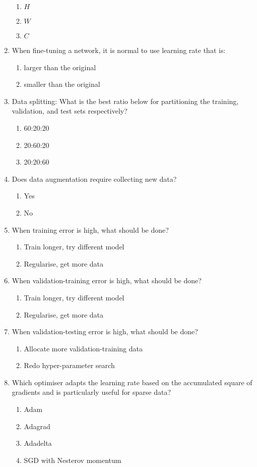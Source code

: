 \documentclass{report}
\numberwithin{equation}{section}
\begin{document}
\begin{enumerate}
\begin{enumerate}[label=\alph*.]
\item $H$
\item $W$
\item $C$
\end{enumerate}
\item When fine-tuning a network, it is normal to use learning rate that is:
\begin{enumerate}[label=\alph*.]
\item larger than the original
\item smaller than the original
\end{enumerate}
\item Data splitting: What is the best ratio below for partitioning the training, validation, and test sets respectively?
\begin{enumerate}[label=\alph*.]
\item 60:20:20
\item 20:60:20
\item 20:20:60
\end{enumerate}
\item Does data augmentation require collecting new data?
\begin{enumerate}[label=\alph*.]
\item Yes
\item No

\end{enumerate}
\item When training error is high, what should be done?
\begin{enumerate}[label=\alph*.]
\item Train longer, try different model
\item Regularise, get more data
\end{enumerate}
\item When validation-training error is high, what should be done?
\begin{enumerate}[label=\alph*.]
\item Train longer, try different model
\item Regularise, get more data
\end{enumerate}
\item When validation-testing error is high, what should be done?
\begin{enumerate}[label=\alph*.]
\item Allocate more validation-training data
\item Redo hyper-parameter search
\end{enumerate}
\item Which optimiser adapts the learning rate based on the accumulated square of gradients and is particularly useful for sparse data?
\begin{enumerate}[label=\alph*.]
\item Adam
\item Adagrad
\item Adadelta
\item SGD with Nesterov momentum
\end{enumerate}


\end{enumerate}
\end{document}
